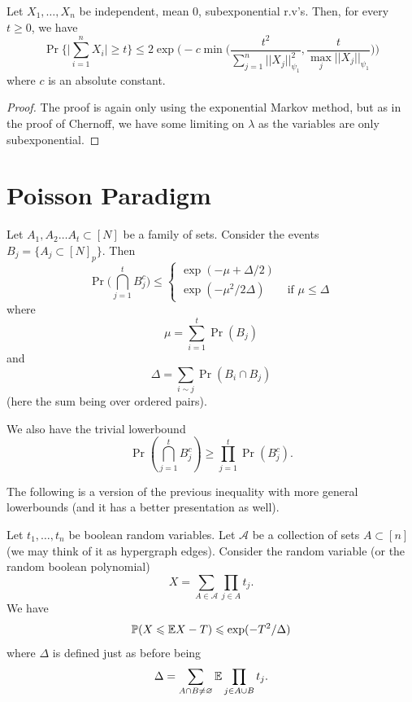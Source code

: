 \begin{theorem} 
	\label{trm:bernstein_ineq}
	Let $X_1, \dots, X_n$ be independent, mean $0$, subexponential r.v's.
 Then, for every $t \geq 0$, we have
	\[
		\Pr\bigg\{\bigg|\sum_{i=1}^n X_i\bigg| \geq t\bigg\} \leq
		2\exp\bigg(-c\min\bigg(\frac{t^2}{\sum_{j = 1}^{n}
		||X_j||_{\psi_1}^2},\frac{t}{\max_j {||X_j}||_{\psi_1}}\bigg)\bigg)
	\]
	where $c$ is an absolute constant.
\end{theorem}
\begin{proof}
	The proof is again only using the exponential Markov method, but as
	in the proof of Chernoff, we have some limiting on $\lambda$ as the
	variables are only subexponential.
\end{proof}

\section{Poisson Paradigm}

\begin{theorem}
	\label{trm:janson_ineq}
	Let $A_1, A_2 \dots A_t \subset [N]$ be a family of sets. Consider the events
	$B_j = \{A_j \subset [N]_p\}$. Then
	\begin{equation}
		\Pr\bigg( \bigcap_{j=1}^t B_j^c\bigg) \leq
		\begin{cases}
			\exp(-\mu + \Delta/2)\\
			\exp(-\mu^2/2\Delta) & \text{ if } \mu \leq \Delta
		\end{cases}
	\end{equation}
	where
	\[\mu = \sum_{i =1 }^{t} \Pr(B_j)\]
	and
	\[
		\Delta = \sum_{i \sim j}\Pr(B_i \cap B_j)
	\]
	(here the sum being over ordered pairs).
\end{theorem}

\begin{remark}
	We also have the trivial lowerbound
	\[
		\Pr(\bigcap_{j=1}^{t} B_j^c) \geq \prod_{j = 1}^t \Pr(B_j^c).
	\]
\end{remark}

\begin{remark}
    The following is a version of the previous inequality with more general 
    lowerbounds (and it has a better presentation as well).
\end{remark}
\begin{theorem}
    Let $t_1, \dots, t_n$ be boolean random variables. Let $\mathcal{A}$ be a 
    collection of sets $A \subset [n]$ (we may think of it as hypergraph edges).
    Consider the random variable (or the random boolean polynomial)
    \[
    X = \sum_{A \in \mathcal{A}} \prod_{j \in A} t_j.
    \]
    We have 
    \[
    \mathbb{P}(X \leqslant \mathbb{E} X - T) \leqslant \exp(-T^2/\Delta)
    \]
    where $\Delta$ is defined just as before being 
    \[
        \Delta = \sum_{A \cap B \neq \varnothing} \mathbb{E} \prod_{j \in A \cup B} t_j.
    \]
\end{theorem}

